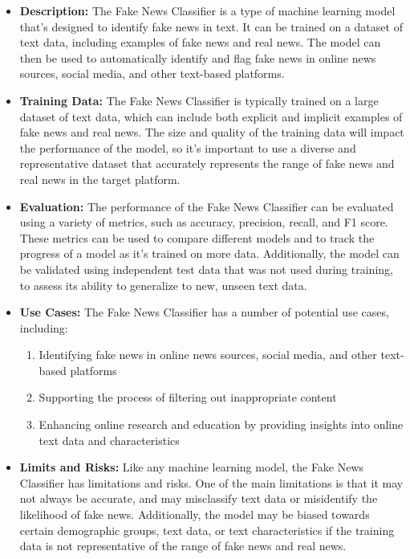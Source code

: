 \begin{itemize}
    \item \textbf{Description:} The Fake News Classifier is a type of machine learning model that's designed to identify fake news in text. It can be trained on a dataset of text data, including examples of fake news and real news. The model can then be used to automatically identify and flag fake news in online news sources, social media, and other text-based platforms.
    \item \textbf{Training Data:} The Fake News Classifier is typically trained on a large dataset of text data, which can include both explicit and implicit examples of fake news and real news. The size and quality of the training data will impact the performance of the model, so it's important to use a diverse and representative dataset that accurately represents the range of fake news and real news in the target platform.
    \item \textbf{Evaluation:} The performance of the Fake News Classifier can be evaluated using a variety of metrics, such as accuracy, precision, recall, and F1 score. These metrics can be used to compare different models and to track the progress of a model as it's trained on more data. Additionally, the model can be validated using independent test data that was not used during training, to assess its ability to generalize to new, unseen text data.
    \item \textbf{Use Cases:} The Fake News Classifier has a number of potential use cases, including:
        \begin{enumerate}  
            \item Identifying fake news in online news sources, social media, and other text-based platforms
            \item Supporting the process of filtering out inappropriate content
            \item Enhancing online research and education by providing insights into online text data and characteristics
        \end{enumerate}
    \item \textbf{Limits and Risks:} Like any machine learning model, the Fake News Classifier has limitations and risks. One of the main limitations is that it may not always be accurate, and may misclassify text data or misidentify the likelihood of fake news. Additionally, the model may be biased towards certain demographic groups, text data, or text characteristics if the training data is not representative of the range of fake news and real news.

\end{itemize}
